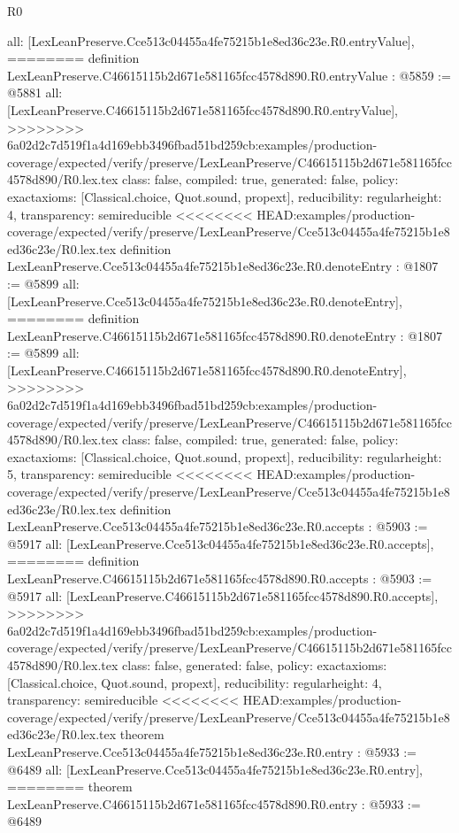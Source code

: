 \begin{lexlean}{R0}
\begin{coremodule}
{{{{{{{{{{{{{{{{{{{{{{{{{{{{{{{{{{{{{{{{{{{{{{{{{{{{{{{{{{{{{{{{{{{{{{{{{{{{{{{{{{{{{{{{{{{{{{{{{{{{  all: [LexLeanPreserve.Cce513c04455a4fe75215b1e8ed36c23e.R0.entryValue],
========
definition LexLeanPreserve.C46615115b2d671e581165fcc4578d890.R0.entryValue : @5859 := @5881 {
  all: [LexLeanPreserve.C46615115b2d671e581165fcc4578d890.R0.entryValue],
>>>>>>>> 6a02d2c7d519f1a4d169ebb3496fbad51bd259cb:examples/production-coverage/expected/verify/preserve/LexLeanPreserve/C46615115b2d671e581165fcc4578d890/R0.lex.tex
  class: false,
  compiled: true,
  generated: false,
  policy: exact{axioms: [Classical.choice, Quot.sound, propext]},
  reducibility: regular{height: 4},
  transparency: semireducible
}
<<<<<<<< HEAD:examples/production-coverage/expected/verify/preserve/LexLeanPreserve/Cce513c04455a4fe75215b1e8ed36c23e/R0.lex.tex
definition LexLeanPreserve.Cce513c04455a4fe75215b1e8ed36c23e.R0.denoteEntry : @1807 := @5899 {
  all: [LexLeanPreserve.Cce513c04455a4fe75215b1e8ed36c23e.R0.denoteEntry],
========
definition LexLeanPreserve.C46615115b2d671e581165fcc4578d890.R0.denoteEntry : @1807 := @5899 {
  all: [LexLeanPreserve.C46615115b2d671e581165fcc4578d890.R0.denoteEntry],
>>>>>>>> 6a02d2c7d519f1a4d169ebb3496fbad51bd259cb:examples/production-coverage/expected/verify/preserve/LexLeanPreserve/C46615115b2d671e581165fcc4578d890/R0.lex.tex
  class: false,
  compiled: true,
  generated: false,
  policy: exact{axioms: [Classical.choice, Quot.sound, propext]},
  reducibility: regular{height: 5},
  transparency: semireducible
}
<<<<<<<< HEAD:examples/production-coverage/expected/verify/preserve/LexLeanPreserve/Cce513c04455a4fe75215b1e8ed36c23e/R0.lex.tex
definition LexLeanPreserve.Cce513c04455a4fe75215b1e8ed36c23e.R0.accepts : @5903 := @5917 {
  all: [LexLeanPreserve.Cce513c04455a4fe75215b1e8ed36c23e.R0.accepts],
========
definition LexLeanPreserve.C46615115b2d671e581165fcc4578d890.R0.accepts : @5903 := @5917 {
  all: [LexLeanPreserve.C46615115b2d671e581165fcc4578d890.R0.accepts],
>>>>>>>> 6a02d2c7d519f1a4d169ebb3496fbad51bd259cb:examples/production-coverage/expected/verify/preserve/LexLeanPreserve/C46615115b2d671e581165fcc4578d890/R0.lex.tex
  class: false,
  generated: false,
  policy: exact{axioms: [Classical.choice, Quot.sound, propext]},
  reducibility: regular{height: 4},
  transparency: semireducible
}
<<<<<<<< HEAD:examples/production-coverage/expected/verify/preserve/LexLeanPreserve/Cce513c04455a4fe75215b1e8ed36c23e/R0.lex.tex
theorem LexLeanPreserve.Cce513c04455a4fe75215b1e8ed36c23e.R0.entry : @5933 := @6489 {
  all: [LexLeanPreserve.Cce513c04455a4fe75215b1e8ed36c23e.R0.entry],
========
theorem LexLeanPreserve.C46615115b2d671e581165fcc4578d890.R0.entry : @5933 := @6489 {
}}}}}}}}}}}}}}}}}}}}}}}}}}}}}}}}}}}}}}}}}}}}}}}}}}}}}}}}}}}}}}}}}}}}}}}}}}}}}}}}}}}}}}}}}}}}}}}}}}}}}}}}
\end{coremodule}
\end{lexlean}
